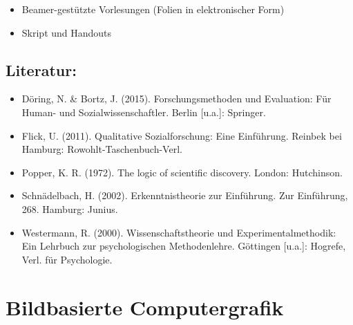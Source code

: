 \begin{itemize}
\tightlist
\item
  Beamer-gestützte Vorlesungen (Folien in elektronischer Form)
\item
  Skript und Handouts
\end{itemize}

\section*{Literatur:\label{/mi-2017/modulbeschreibungen-master/MA_SC_WPF_eScience}}\label{literaturpathlabelmi-2017modulbeschreibungen-mastermaux5fscux5fwpfux5fescience}

\begin{itemize}
\tightlist
\item
  Döring, N. \& Bortz, J. (2015). Forschungsmethoden und Evaluation: Für
  Human- und Sozialwissenschaftler. Berlin {[}u.a.{]}: Springer.
\item
  Flick, U. (2011). Qualitative Sozialforschung: Eine Einführung.
  Reinbek bei Hamburg: Rowohlt-Taschenbuch-Verl.
\item
  Popper, K. R. (1972). The logic of scientific discovery. London:
  Hutchinson.
\item
  Schnädelbach, H. (2002). Erkenntnistheorie zur Einführung. Zur
  Einführung, 268. Hamburg: Junius.
\item
  Westermann, R. (2000). Wissenschaftstheorie und Experimentalmethodik:
  Ein Lehrbuch zur psychologischen Methodenlehre. Göttingen {[}u.a.{]}:
  Hogrefe, Verl. für Psychologie.
\end{itemize}

\chapter{Bildbasierte
Computergrafik\label{/mi-2017/modulbeschreibungen-master/MA_VC_Modul_BildbasierteComputergrafik}}\label{bildbasierte-computergrafikpathlabelmi-2017modulbeschreibungen-mastermaux5fvcux5fmodulux5fbildbasiertecomputergrafik}

